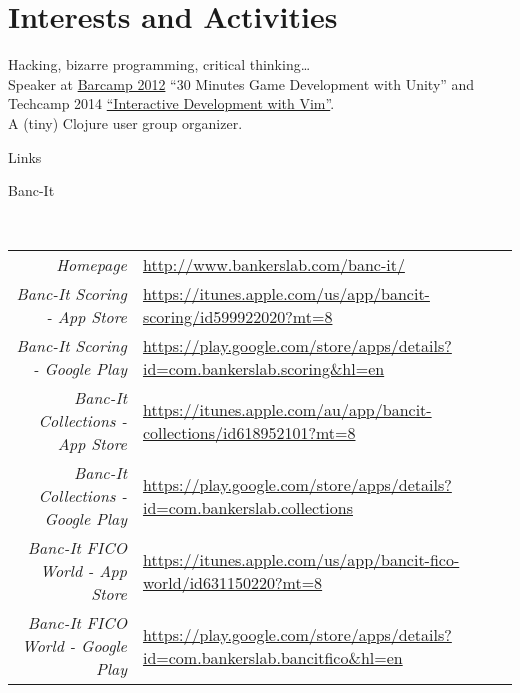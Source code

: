 \documentclass[a4paper,10pt]{article}
\begin{document}
\section{Interests and Activities}
Hacking, bizarre programming, critical thinking\ldots\\
Speaker at \href{http://www.barcampsaigon.org/2012/09/thank-you-barcampers-sponsors-volunteers/}{Barcamp 2012} ``30 Minutes Game Development with Unity'' and Techcamp 2014 \href{http://www.slideshare.net/huylenq/interactive-development-with-vim-techcamp}{``Interactive Development with Vim''}.\\
A (tiny) Clojure user group organizer.\\

\newpage
\par{\centering\LARGE{Links} \par}
\par{\centering\Large \hypertarget{bancit-links}{Banc-It}\par}
\hrulefill\\
\begin{tabular}{rl}
    \textit{Homepage} & \url{http://www.bankerslab.com/banc-it/}\\
    \textit{Banc-It Scoring - App Store} & \url{https://itunes.apple.com/us/app/bancit-scoring/id599922020?mt=8}\\
    \textit{Banc-It Scoring - Google Play} & \url{https://play.google.com/store/apps/details?id=com.bankerslab.scoring\&hl=en}\\
    \textit{Banc-It Collections - App Store} & \url{https://itunes.apple.com/au/app/bancit-collections/id618952101?mt=8}\\
    \textit{Banc-It Collections - Google Play} & \url{https://play.google.com/store/apps/details?id=com.bankerslab.collections}\\
    \textit{Banc-It FICO World - App Store} & \url{https://itunes.apple.com/us/app/bancit-fico-world/id631150220?mt=8}\\
    \textit{Banc-It FICO World - Google Play} & \url{https://play.google.com/store/apps/details?id=com.bankerslab.bancitfico&hl=en}
\end{tabular}



\end{document}
